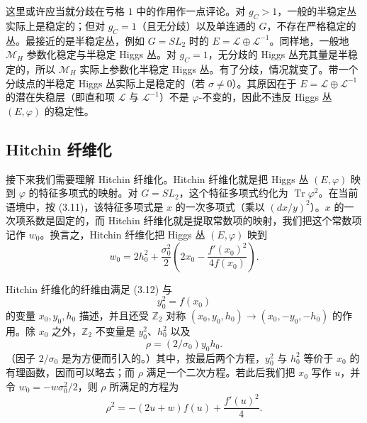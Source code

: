 \documentclass[11pt,a4paper]{article}
\begin{document}
这里或许应当就分歧在亏格 $1$ 中的作用作一点评论。对 $g_C>1$，一般的半稳定丛实际上是稳定的；但对 $g_C=1$（且无分歧）以及单连通的 $G$，不存在严格稳定的丛。最接近的是半稳定丛，例如 $G=SL_2$ 时的 $E=\mathcal{L}\oplus\mathcal{L}^{-1}$。同样地，一般地 $\mathcal{M}_H$ 参数化稳定与半稳定 Higgs 丛。对 $g_C=1$，无分歧的 Higgs 丛充其量是半稳定的，所以 $\mathcal{M}_H$ 实际上参数化半稳定 Higgs 丛。有了分歧，情况就变了。带一个分歧点的半稳定 Higgs 丛实际上是稳定的（若 $\sigma\ne 0$）。其原因在于 $E=\mathcal{L}\oplus\mathcal{L}^{-1}$ 的潜在失稳层（即直和项 $\mathcal{L}$ 与 $\mathcal{L}^{-1}$）不是 $\varphi$-不变的，因此不违反 Higgs 丛 $(E,\varphi)$ 的稳定性。

\subsection{Hitchin 纤维化}

接下来我们需要理解 Hitchin 纤维化。Hitchin 纤维化就是把 Higgs 丛 $(E,\varphi)$ 映到 $\varphi$ 的特征多项式的映射。对 $G=SL_2$，这个特征多项式约化为 $\operatorname{Tr}\varphi^2$。在当前语境中，按 (3.11)，该特征多项式是 $x$ 的一次多项式（乘以 $(dx/y)^2$）。$x$ 的一次项系数是固定的，而 Hitchin 纤维化就是提取常数项的映射，我们把这个常数项记作 $w_0$。换言之，Hitchin 纤维化把 Higgs 丛 $(E,\varphi)$ 映到
\begin{equation}\tag{3.12}
w_0=2h_0^2+\frac{\sigma_0^2}{2}\left(2x_0-\frac{f'(x_0)^2}{4f(x_0)}\right).
\end{equation}


Hitchin 纤维化的纤维由满足 (3.12) 与
\begin{equation}\tag{3.13}
y_0^2=f(x_0)
\end{equation}
的变量 $x_0,y_0,h_0$ 描述，并且还受 $\mathbb{Z}_2$ 对称 $(x_0,y_0,h_0)\to(x_0,-y_0,-h_0)$ 的作用。除 $x_0$ 之外，$\mathbb{Z}_2$ 不变量是 $y_0^2$、$h_0^2$ 以及
\begin{equation}\tag{3.14}
\rho=(2/\sigma_0)y_0h_0.
\end{equation}
（因子 $2/\sigma_0$ 是为方便而引入的。）其中，按最后两个方程，$y_0^2$ 与 $h_0^2$ 等价于 $x_0$ 的有理函数，因而可以略去；而 $\rho$ 满足一个二次方程。若此后我们把 $x_0$ 写作 $u$，并令 $w_0=-w\sigma_0^2/2$，则 $\rho$ 所满足的方程为
\begin{equation}\tag{3.15}
\rho^2=-(2u+w)f(u)+\frac{f'(u)^2}{4}.
\end{equation}
\end{document}
